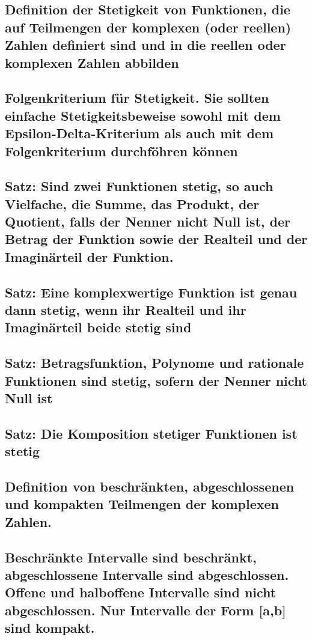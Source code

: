 \subsection{Definition der Stetigkeit von Funktionen, die auf Teilmengen der komplexen (oder reellen) Zahlen definiert sind und in die reellen oder komplexen Zahlen abbilden}

\subsection{Folgenkriterium für Stetigkeit. Sie sollten einfache Stetigkeitsbeweise sowohl mit dem Epsilon-Delta-Kriterium als auch mit dem Folgenkriterium durchföhren können}

\subsection{Satz: Sind zwei Funktionen stetig, so auch Vielfache, die Summe, das Produkt, der Quotient, falls der Nenner nicht Null ist, der Betrag der Funktion sowie der Realteil und der Imaginärteil der Funktion.}

\subsection{Satz: Eine komplexwertige Funktion ist genau dann stetig, wenn ihr Realteil und ihr Imaginärteil beide stetig sind}

\subsection{Satz: Betragsfunktion, Polynome und rationale Funktionen sind stetig, sofern der Nenner nicht Null ist}

\subsection{Satz: Die Komposition stetiger Funktionen ist stetig}

\subsection{Definition von beschränkten, abgeschlossenen und kompakten Teilmengen der komplexen Zahlen.}

\subsection{Beschränkte Intervalle sind beschränkt, abgeschlossene Intervalle sind abgeschlossen. Offene und halboffene Intervalle sind nicht abgeschlossen. Nur Intervalle der Form [a,b] sind kompakt.}

